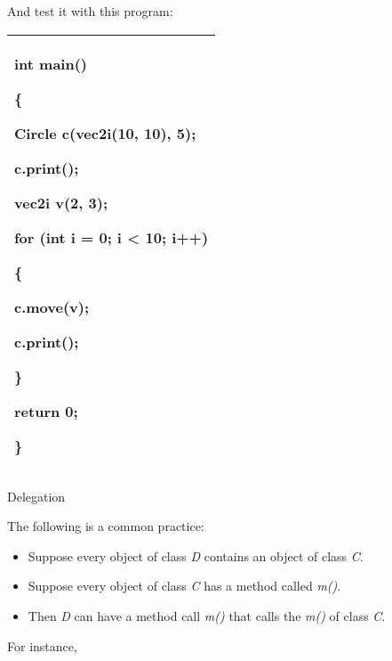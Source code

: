 \documentclass[
]{article}
\providecommand{\tightlist}{%
  \setlength{\itemsep}{0pt}\setlength{\parskip}{0pt}}
\begin{document}
And test it with this program:

\begin{longtable}[]{@{}l@{}}
\toprule
\endhead
\begin{minipage}[t]{0.97\columnwidth}\raggedright
int main()

\{

Circle c(vec2i(10, 10), 5);

c.print();

vec2i v(2, 3);

for (int i = 0; i \textless{} 10; i++)

\{

c.move(v);

c.print();

\}

return 0;

\}\strut
\end{minipage}\tabularnewline
\bottomrule
\end{longtable}

Delegation

The following is a common practice:

\begin{itemize}
\tightlist
\item
  Suppose every object of class \emph{D} contains an object of class
  \emph{C}.
\end{itemize}

\begin{itemize}
\tightlist
\item
  Suppose every object of class \emph{C} has a method called \emph{m()}.
\end{itemize}

\begin{itemize}
\tightlist
\item
  Then \emph{D} can have a method call \emph{m()} that calls the
  \emph{m()} of class \emph{C}.
\end{itemize}

For instance,
\end{document}
